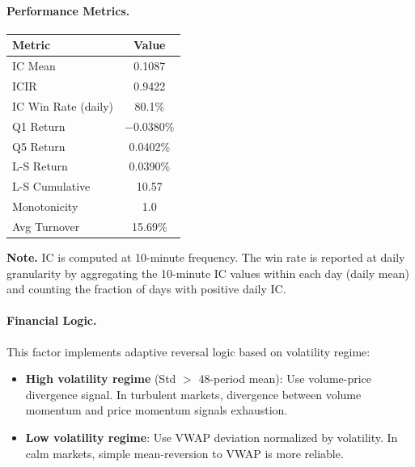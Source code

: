 \documentclass[sigconf]{acmart}
\begin{document}
\paragraph{Performance Metrics.}
\begin{table}[h]
  \centering
  \begin{small}
  \begin{tabular}{lc}
    \toprule
    Metric & Value \\
    \midrule
    IC Mean & 0.1087 \\
    ICIR & 0.9422 \\
    IC Win Rate (daily) & 80.1\% \\
    Q1 Return & $-$0.0380\% \\
    Q5 Return & 0.0402\% \\
    L-S Return & 0.0390\% \\
    L-S Cumulative & 10.57 \\
    Monotonicity & 1.0 \\
    Avg Turnover & 15.69\% \\
    \bottomrule
  \end{tabular}
  \end{small}
\end{table}
\noindent\textbf{Note.} IC is computed at 10-minute frequency. The win rate is reported at daily granularity by aggregating the 10-minute IC values within each day (daily mean) and counting the fraction of days with positive daily IC.

\paragraph{Financial Logic.}
This factor implements adaptive reversal logic based on volatility regime:
{\setlength{\leftmargini}{1.4em}%
\begin{itemize}
  \item \textbf{High volatility regime} (Std $>$ 48-period mean): Use volume-price divergence signal. In turbulent markets, divergence between volume momentum and price momentum signals exhaustion.
  \item \textbf{Low volatility regime}: Use VWAP deviation normalized by volatility. In calm markets, simple mean-reversion to VWAP is more reliable.
\end{itemize}
}
\end{document}
